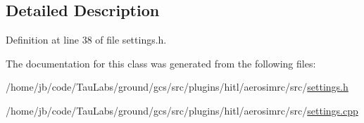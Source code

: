 \subsection{\-Detailed \-Description}


\-Definition at line 38 of file settings.\-h.



\-The documentation for this class was generated from the following files\-:\begin{DoxyCompactItemize}
\item 
/home/jb/code/\-Tau\-Labs/ground/gcs/src/plugins/hitl/aerosimrc/src/\hyperlink{settings_8h}{settings.\-h}\item 
/home/jb/code/\-Tau\-Labs/ground/gcs/src/plugins/hitl/aerosimrc/src/\hyperlink{settings_8cpp}{settings.\-cpp}\end{DoxyCompactItemize}

